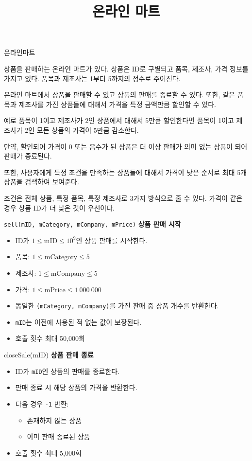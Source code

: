 \documentclass{beamer}
\title{온라인 마트}
\author{}
\date{\number\year년 \number\month월 \number\day일}
\begin{document}
\frame{\titlepage}

\begin{frame}{온라인마트}

\footnotesize

상품을 판매하는 온라인 마트가 있다. 상품은 ID로 구별되고 품목, 제조사, 가격 정보를 가지고 있다. 품목과 제조사는 1부터 5까지의 정수로 주어진다.

온라인 마트에서 상품을 판매할 수 있고 상품의 판매를 종료할 수 있다. 또한, 같은 품목과 제조사를 가진 상품들에 대해서 가격을 특정 금액만큼 할인할 수 있다.

예로 품목이 1이고 제조사가 2인 상품에서 대해서 5만큼 할인한다면 품목이 1이고 제조사가 2인 모든 상품의 가격이 5만큼 감소한다.

만약, 할인되어 가격이 0 또는 음수가 된 상품은 더 이상 판매가 의미 없는 상품이 되어 판매가 종료된다.

또한, 사용자에게 특정 조건을 만족하는 상품들에 대해서 가격이 낮은 순서로 최대 5개 상품을 검색하여 보여준다.

조건은 전체 상품, 특정 품목, 특정 제조사로 3가지 방식으로 줄 수 있다. 가격이 같은 경우 상품 ID가 더 낮은 것이 우선이다.

\end{frame}

\begin{frame}{\texttt{sell(mID, mCategory, mCompany, mPrice)}}
\textbf{상품 판매 시작}

\begin{itemize}
    \item ID가 $1 \le \text{mID} \le 10^9$인 상품 판매를 시작한다.
    \item 품목: $1 \le \text{mCategory} \le 5$
    \item 제조사: $1 \le \text{mCompany} \le 5$
    \item 가격: $1 \le \text{mPrice} \le 1\ 000\ 000$
    \item 동일한 \texttt{(mCategory, mCompany)}를 가진 판매 중 상품 개수를 반환한다.
    \item \texttt{mID}는 이전에 사용된 적 없는 값이 보장된다.
    \item 호출 횟수 최대 50,000회   
\end{itemize}
\end{frame}

\begin{frame}{closeSale(mID)}
\textbf{상품 판매 종료}

\begin{itemize}
    \item ID가 \texttt{mID}인 상품의 판매를 종료한다.
    \item 판매 종료 시 해당 상품의 가격을 반환한다.
    \item 다음 경우 \texttt{-1} 반환:
    \begin{itemize}
        \item 존재하지 않는 상품
        \item 이미 판매 종료된 상품
    \end{itemize}
    \item 호출 횟수 최대 5,000회
\end{itemize}
\end{frame}
\end{document}
